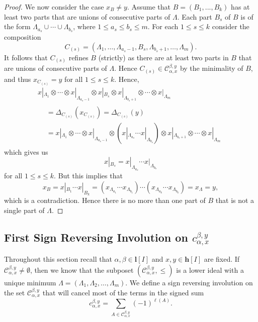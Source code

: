 \documentclass[ALCO,ThmDefs,Unicode,epreuves]{cedram}
\newcommand{\bh}{\mathbf{h}}
\begin{document}
\begin{proof}
We now consider the case $x_B\ne y$.
Assume that $B=(B_1,...,B_k)$ has at least two parts that are unions of consecutive parts of $\Lambda$. Each part $B_s$ of $B$ is of the form $\Lambda_{a_s}\cup\cdots\cup\Lambda_{b_s}$, where $1\leq a_s\leq b_s\leq m$. For each $1\leq s\leq k$ consider the composition 
 $$ C_{(s)}=(\Lambda_1,\ldots,\Lambda_{a_s-1},B_s,\Lambda_{b_s+1},\ldots,\Lambda_m).
 $$
It follows that $C_{(s)}$ refines $B$ (strictly) as there are at least two parts in $B$ that are unions of consecutive parts of $\Lambda$. Hence $C_{(s)}\in \mathcal{C}_{\alpha,x}^{\beta,y}$ by the minimality of $B$, and thus $x_{C_{(s)}}=y$ for all $1\le s\le k$. Hence,
 \begin{multline*}
x|_{\Lambda_1}\otimes\cdots\otimes x|_{\Lambda_{a_s-1}}\otimes x|_{B_s}\otimes x|_{\Lambda_{b_s+1}} 
 \otimes\cdots\otimes x|_{\Lambda_m} \\
 \begin{aligned}
 &= \Delta_{C_{(s)}}(x_{C_{(s)}}) = \Delta_{C_{(s)}}(y) \\
 &= x|_{\Lambda_1}\otimes\cdots\otimes x|_{\Lambda_{a_s-1}}\otimes(x|_{\Lambda_{a_s}}\cdots x|_{\Lambda_{b_s}})\otimes x|_{\Lambda_{b_s+1}}
 \otimes\cdots\otimes x|_{\Lambda_m}
 \end{aligned}
\end{multline*}
 which gives us
 $$ x|_{B_s} = x|_{\Lambda_{a_s}}\cdots x|_{\Lambda_{b_s}}$$
 for all $1\le s\le k$. But this implies that
 $$ x_B = x|_{B_1} \cdots x|_{B_k} =(x_{\Lambda_{a_1}}\cdots x_{\Lambda_{b_1}})\cdots (x_{\Lambda_{a_k}}\cdots x_{\Lambda_{b_k}})=x_\Lambda=y,$$
 which is a contradiction. Hence there is no more than one part of $B$ that is not a single part of $\Lambda$.
\end{proof}

\subsection{First Sign Reversing Involution on \texorpdfstring{$c_{\alpha,x}^{\beta,y}$}{c alpha,x beta,y}}\label{ss:involution}
Throughout this section recall that $\alpha,\beta\in\mathbf{l} [I]$ and $x,y\in\bh [I]$ are fixed. If $\mathcal{C}_{\alpha,x}^{\beta,y}\ne\emptyset$, then we know that the subposet $(\mathcal{C}_{\alpha,x}^{\beta,y},\le)$ is a lower ideal with a unique minimum $\Lambda=(\Lambda_1,\Lambda_2,\ldots,\Lambda_m)$. 
We define a sign reversing involution on the set $\mathcal{C}_{\alpha,x}^{\beta,y}$ that will cancel most of the terms in the signed sum
\begin{equation}\label{eq:anticoef}
 c_{\alpha,x}^{\beta,y}=\sum_{A\in \mathcal{C}_{\alpha,x}^{\beta,y}} (-1)^{\ell(A)}.
\end{equation}
\end{document}
